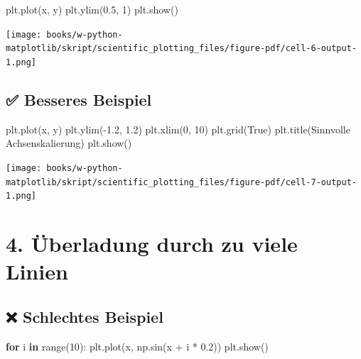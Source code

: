 \documentclass[
  letterpaper,
  DIV=11,
  numbers=noendperiod]{scrreprt}
\newenvironment{Shaded}{\begin{snugshade}}{\end{snugshade}}
\newcommand{\BuiltInTok}[1]{\textcolor[rgb]{0.00,0.23,0.31}{#1}}
\newcommand{\ControlFlowTok}[1]{\textcolor[rgb]{0.00,0.23,0.31}{\textbf{#1}}}
\newcommand{\DecValTok}[1]{\textcolor[rgb]{0.68,0.00,0.00}{#1}}
\newcommand{\FloatTok}[1]{\textcolor[rgb]{0.68,0.00,0.00}{#1}}
\newcommand{\KeywordTok}[1]{\textcolor[rgb]{0.00,0.23,0.31}{\textbf{#1}}}
\newcommand{\NormalTok}[1]{\textcolor[rgb]{0.00,0.23,0.31}{#1}}
\newcommand{\OperatorTok}[1]{\textcolor[rgb]{0.37,0.37,0.37}{#1}}
\newcommand{\StringTok}[1]{\textcolor[rgb]{0.13,0.47,0.30}{#1}}
\newcommand{\VariableTok}[1]{\textcolor[rgb]{0.07,0.07,0.07}{#1}}
\begin{document}
\begin{Shaded}
\begin{Highlighting}[]
\NormalTok{plt.plot(x, y)}
\NormalTok{plt.ylim(}\FloatTok{0.5}\NormalTok{, }\DecValTok{1}\NormalTok{)}
\NormalTok{plt.show()}
\end{Highlighting}
\end{Shaded}

\texttt{[image: books/w-python-matplotlib/skript/scientific\_plotting\_files/figure-pdf/cell-6-output-1.png]}

\subsection{✅ Besseres Beispiel}\label{besseres-beispiel-2}

\begin{Shaded}
\begin{Highlighting}[]
\NormalTok{plt.plot(x, y)}
\NormalTok{plt.ylim(}\OperatorTok{{-}}\FloatTok{1.2}\NormalTok{, }\FloatTok{1.2}\NormalTok{)}
\NormalTok{plt.xlim(}\DecValTok{0}\NormalTok{, }\DecValTok{10}\NormalTok{)}
\NormalTok{plt.grid(}\VariableTok{True}\NormalTok{)}
\NormalTok{plt.title(}\StringTok{\textquotesingle{}Sinnvolle Achsenskalierung\textquotesingle{}}\NormalTok{)}
\NormalTok{plt.show()}
\end{Highlighting}
\end{Shaded}

\texttt{[image: books/w-python-matplotlib/skript/scientific\_plotting\_files/figure-pdf/cell-7-output-1.png]}

\section{4. Überladung durch zu viele
Linien}\label{uxfcberladung-durch-zu-viele-linien}

\subsection{❌ Schlechtes Beispiel}\label{schlechtes-beispiel-3}

\begin{Shaded}
\begin{Highlighting}[]
\ControlFlowTok{for}\NormalTok{ i }\KeywordTok{in} \BuiltInTok{range}\NormalTok{(}\DecValTok{10}\NormalTok{):}
\NormalTok{    plt.plot(x, np.sin(x }\OperatorTok{+}\NormalTok{ i }\OperatorTok{*} \FloatTok{0.2}\NormalTok{))}
\NormalTok{plt.show()}
\end{Highlighting}
\end{Shaded}
\end{document}
